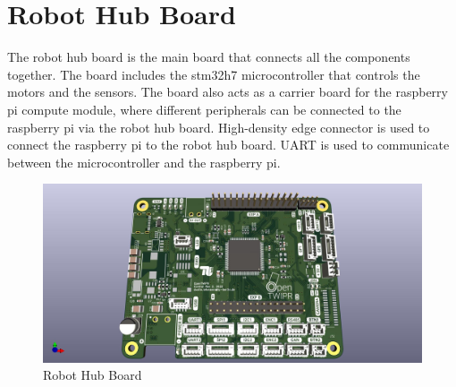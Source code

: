 \section{Robot Hub Board}
The robot hub board is the main board that connects all the components together.
The board includes the stm32h7 microcontroller that controls the motors and the sensors.
The board also acts as a carrier board for the raspberry pi compute module, where different peripherals can be connected to the raspberry pi via the robot hub board.
High-density edge connector is used to connect the raspberry pi to the robot hub board.
UART is used to communicate between the microcontroller and the raspberry pi.
\begin{figure}[h]
	\centering
	\includegraphics[width=1\linewidth]{Robot_Hub_Board}
	\caption[ Robot Hub Board ]{Robot Hub Board}
	\label{fig:robothubboard}
\end{figure}

\newpage
